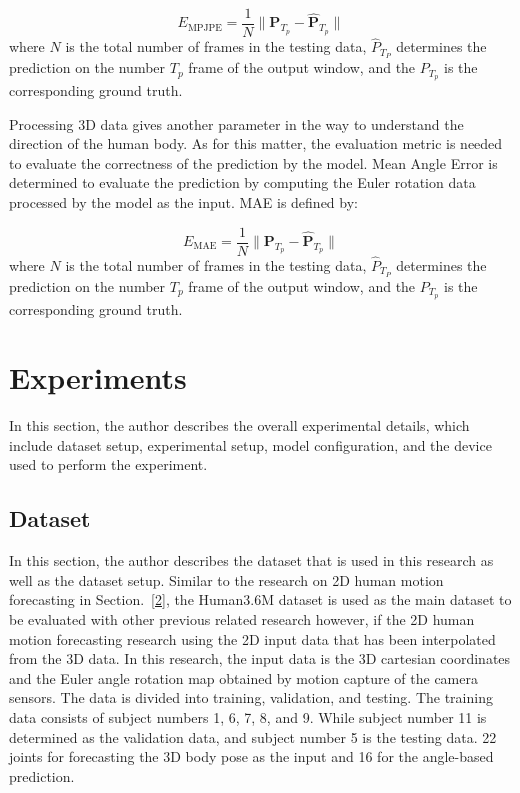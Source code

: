 \begin{equation}\label{eq:mpjpe3D}
    E_\mathrm{MPJPE} =
        \frac{1}{N}
        \| \mathbf{P}_{T_p} - \mathbf{\hat{P}}_{T_p} \|
\end{equation}
where $N$ is the total number of frames in the testing data, $\hat{P}_{T_P}$ determines the prediction on the number $T_p$ frame of the output window, and the $P_{T_p}$ is the corresponding ground truth.

Processing 3D data gives another parameter in the way to understand the direction of the human body. As for this matter, the evaluation metric is needed to evaluate the correctness of the prediction by the model. Mean Angle Error is determined to evaluate the prediction by computing the Euler rotation data processed by the model as the input. MAE is defined by:

\begin{equation}\label{eq:mae3D}
    E_\mathrm{MAE} =
        \frac{1}{N}
        \| \mathbf{P}_{T_p} - \mathbf{\hat{P}}_{T_p} \|
\end{equation}
where $N$ is the total number of frames in the testing data, $\hat{P}_{T_P}$ determines the prediction on the number $T_p$ frame of the output window, and the $P_{T_p}$ is the corresponding ground truth.


\section{Experiments}\label{4:experiment}
In this section, the author describes the overall experimental details, which include dataset setup, experimental setup, model configuration, and the device used to perform the experiment.
\subsection{Dataset}\label{4:dataset}
In this section, the author describes the dataset that is used in this research as well as the dataset setup.
Similar to the research on 2D human motion forecasting in Section.~\ref{2}, the Human3.6M dataset is used as the main dataset to be evaluated with other previous related research however, if the 2D human motion forecasting research using the 2D input data that has been interpolated from the 3D data. In this research, the input data is the 3D cartesian coordinates and the Euler angle rotation map obtained by motion capture of the camera sensors. The data is divided into training, validation, and testing. The training data consists of subject numbers 1, 6, 7, 8, and 9. While subject number 11 is determined as the validation data, and subject number 5 is the testing data. 22 joints for forecasting the 3D body pose as the input and 16 for the angle-based prediction. 

